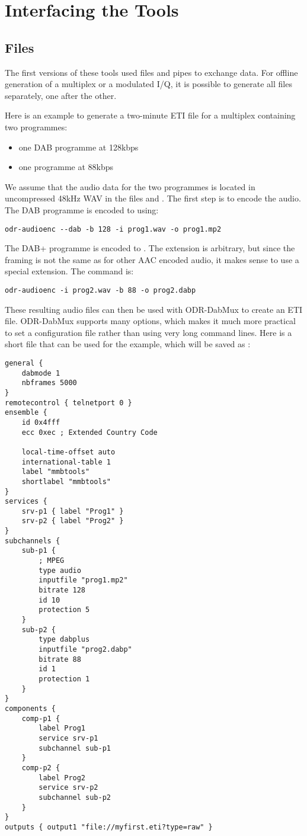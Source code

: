 \section{Interfacing the Tools}
\subsection{Files}
\label{sec-files}
The first versions of these tools used files and pipes to exchange data. For
offline generation of a multiplex or a modulated I/Q, it is possible to
generate all files separately, one after the other.

Here is an example to generate a two-minute ETI file for a multiplex containing
two programmes:
\begin{itemize}
    \item one DAB programme at 128kbps
    \item one \dabplus{} programme at 88kbps
\end{itemize}

We assume that the audio data for the two programmes is located in uncompressed
48kHz WAV in the files  and . The first step
is to encode the audio. The DAB programme is encoded to  using:
\begin{lstlisting}
odr-audioenc --dab -b 128 -i prog1.wav -o prog1.mp2
\end{lstlisting}

The DAB+ programme is encoded to . The extension
 is arbitrary, but since the framing is not the same as for
other AAC encoded audio, it makes sense to use a special extension. The command
is:
\begin{lstlisting}
odr-audioenc -i prog2.wav -b 88 -o prog2.dabp
\end{lstlisting}

These resulting audio files can then be used with ODR-DabMux to create an ETI file.
ODR-DabMux supports many options, which makes it much more practical to set
a configuration file rather than using very long command lines. Here is a short
file that can be used for the example, which will be saved as :
\begin{lstlisting}
general {
    dabmode 1
    nbframes 5000
}
remotecontrol { telnetport 0 }
ensemble {
    id 0x4fff
    ecc 0xec ; Extended Country Code

    local-time-offset auto
    international-table 1
    label "mmbtools"
    shortlabel "mmbtools"
}
services {
    srv-p1 { label "Prog1" }
    srv-p2 { label "Prog2" }
}
subchannels {
    sub-p1 {
        ; MPEG
        type audio
        inputfile "prog1.mp2"
        bitrate 128
        id 10
        protection 5
    }
    sub-p2 {
        type dabplus
        inputfile "prog2.dabp"
        bitrate 88
        id 1
        protection 1
    }
}
components {
    comp-p1 {
        label Prog1
        service srv-p1
        subchannel sub-p1
    }
    comp-p2 {
        label Prog2
        service srv-p2
        subchannel sub-p2
    }
}
outputs { output1 "file://myfirst.eti?type=raw" }
\end{lstlisting}

